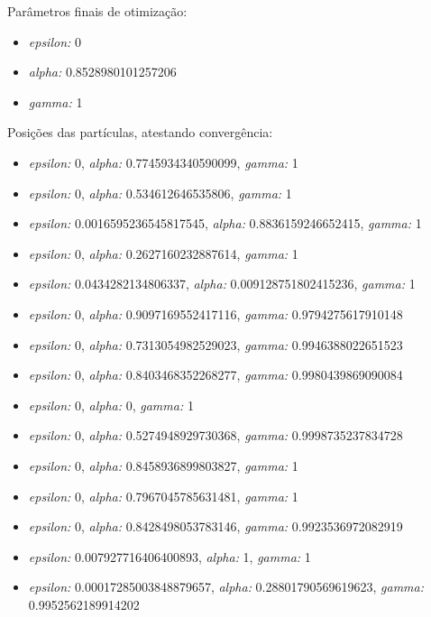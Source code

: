 \documentclass[runningheads]{article}
\begin{document}
\par Parâmetros finais de otimização:
\begin{itemize}
    \item \textit{epsilon:} 0
    \item \textit{alpha:} 0.8528980101257206
    \item \textit{gamma:} 1
\end{itemize}
\par Posições das partículas, atestando convergência:
\begin{itemize}
    \item \textit{epsilon:} 0, \textit{alpha:} 0.7745934340590099, \textit{gamma:} 1
    \item \textit{epsilon:} 0, \textit{alpha:} 0.534612646535806, \textit{gamma:} 1
    \item \textit{epsilon:} 0.0016595236545817545, \textit{alpha:} 0.8836159246652415, \textit{gamma:} 1
    \item \textit{epsilon:} 0, \textit{alpha:} 0.2627160232887614, \textit{gamma:} 1
    \item \textit{epsilon:} 0.0434282134806337, \textit{alpha:} 0.009128751802415236, \textit{gamma:} 1
    \item \textit{epsilon:} 0, \textit{alpha:} 0.9097169552417116, \textit{gamma:} 0.9794275617910148
    \item \textit{epsilon:} 0, \textit{alpha:} 0.7313054982529023, \textit{gamma:} 0.9946388022651523
    \item \textit{epsilon:} 0, \textit{alpha:} 0.8403468352268277, \textit{gamma:} 0.9980439869090084
    \item \textit{epsilon:} 0, \textit{alpha:} 0, \textit{gamma:} 1
    \item \textit{epsilon:} 0, \textit{alpha:} 0.5274948929730368, \textit{gamma:} 0.9998735237834728
    \item \textit{epsilon:} 0, \textit{alpha:} 0.8458936899803827, \textit{gamma:} 1
    \item \textit{epsilon:} 0, \textit{alpha:} 0.7967045785631481, \textit{gamma:} 1
    \item \textit{epsilon:} 0, \textit{alpha:} 0.8428498053783146, \textit{gamma:} 0.9923536972082919
    \item \textit{epsilon:} 0.007927716406400893, \textit{alpha:} 1, \textit{gamma:} 1
    \item \textit{epsilon:} 0.00017285003848879657, \textit{alpha:} 0.28801790569619623, \textit{gamma:} 0.9952562189914202
\end{itemize}
\end{document}
